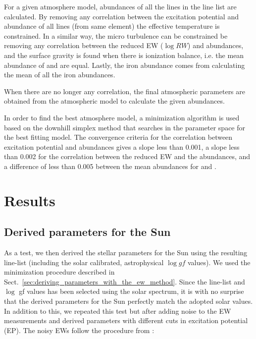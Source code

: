 \documentclass{aa}
\begin{document}
For a given atmosphere model, abundances of all the lines in the line
list are calculated. By removing any correlation between the excitation
potential and abundance of all lines (from same element) the effective
temperature is constrained. In a similar way, the micro turbulence can
be constrained be removing any correlation between the reduced EW ($\log RW$)
and abundances, and the surface gravity is found when there is
ionization balance, i.e. the mean abundance of  and  are equal.
Lastly, the iron abundance comes from calculating the mean of
all the iron abundances.

When there are no longer any correlation, the final atmospheric
parameters are obtained from the atmospheric model to calculate the
given abundances.

In order to find the best atmosphere model, a minimization algorithm
is used based on the downhill simplex method \citep{Press1992} that
searches in the parameter space for the best fitting model. The
convergence criteria for the correlation between excitation potential
and abundances gives a slope less than 0.001, a slope less than 0.002
for the correlation between the reduced EW and the abundances, and a
difference of less than 0.005 between the mean abundances for  and
.







\section{Results}
\label{sec:results}


\subsection{Derived parameters for the Sun}
\label{sec:derived_parameters_of_the_sun}

As a test, we then derived the stellar parameters for the Sun using
the resulting line-list (including the solar calibrated, astrophysical
$\log \mathit{gf}$ values). We used the minimization procedure described
in Sect.~\ref{sec:deriving_parameters_with_the_ew_method}. Since the
line-list and $\log$ gf values has been selected using the solar
spectrum, it is with no surprise that the derived parameters for the
Sun perfectly match the adopted solar values. In addition to this, we
repeated this test but after adding noise to the EW measurements and
derived parameters with different cuts in excitation potential (EP). The
noisy EWs follow the procedure from \cite{Caryel1988}:
\end{document}
